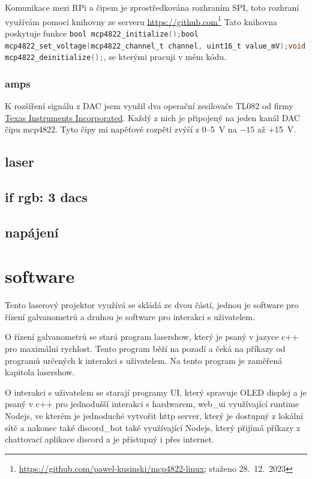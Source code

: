 \documentclass{template/socthesis}
\begin{document}
Komunikace mezi RPi a čipem je zprostředkována rozhraním SPI, toto rozhraní využívám pomocí knihovny ze serveru \url{https://github.com}\footnote{\url{https://github.com/pawel-kusinski/mcp4822-linux}; staženo 28.~12.~2023} %
Tato knihovna poskytuje funkce \lstinline[language=C]!bool mcp4822_initialize();bool mcp4822_set_voltage(mcp4822_channel_t channel, uint16_t value_mV);void mcp4822_deinitialize();!, se kterými pracuji v mém kódu.
\subsection{amps}
K rozšíření signálu z DAC jsem využil dva operační zesilovače TL082 od firmy \href{https://www.ti.com/}{Texas Instruments Incorporated}. Každý z nich je připojený na jeden kanál DAC čipu mcp4822.
Tyto čipy mi napěťové rozpětí zvýší z 0--5~V na $-15$ až +15~V.

\section{laser}
\section{if rgb: 3 dacs}



\section{napájení}

\chapter{software}
Tento laserový projektor využívá se skládá ze dvou částí, jednou je software pro řízení galvanometrů a druhou je software pro interakci s uživatelem.

O řízení galvanometrů se stará program lasershow, který je psaný v jazyce c++ pro maximální rychlost. Tento program běží na pozadí a čeká na příkazy od programů určených k interakci s uživatelem. Na tento program je zaměřená kapitola lasershow. %

O interakci s uživatelem se starají programy UI, který spravuje OLED displej a je psaný v c++ pro jednodušší interakci s hardwarem, web\_ui využívající runtime Nodejs, ve kterém je jednoduché vytvořit http server, který je dostupný z lokální sítě a nakonec také discord\_bot také využívající Nodejs, který přijímá příkazy z chattovací aplikace discord a je přístupný i přes internet.
\end{document}
